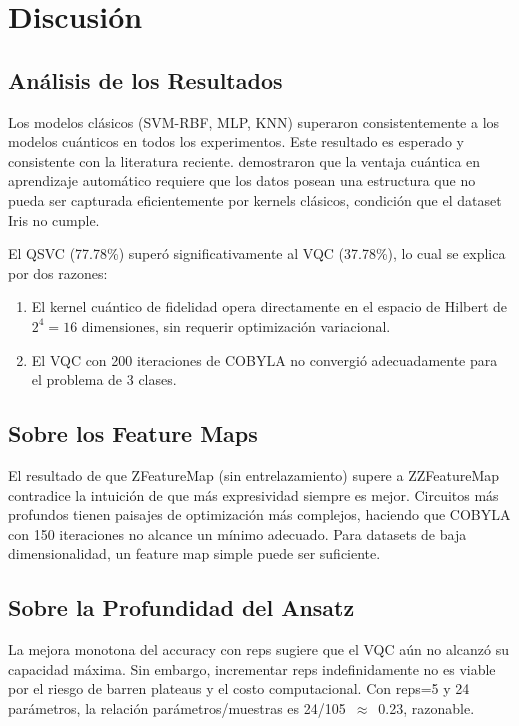 \section{Discusi\'on}

\subsection{An\'alisis de los Resultados}

Los modelos cl\'asicos (SVM-RBF, MLP, KNN) superaron consistentemente a los modelos cu\'anticos en todos los experimentos. Este resultado es esperado y consistente con la literatura reciente. \citet{huang2021} demostraron que la ventaja cu\'antica en aprendizaje autom\'atico requiere que los datos posean una estructura que no pueda ser capturada eficientemente por kernels cl\'asicos, condici\'on que el dataset Iris no cumple.

El QSVC (77.78\%) super\'o significativamente al VQC (37.78\%), lo cual se explica por dos razones:
\begin{enumerate}
    \item El kernel cu\'antico de fidelidad opera directamente en el espacio de Hilbert de $2^4 = 16$ dimensiones, sin requerir optimizaci\'on variacional.
    \item El VQC con 200 iteraciones de COBYLA no convergi\'o adecuadamente para el problema de 3 clases.
\end{enumerate}

\subsection{Sobre los Feature Maps}

El resultado de que ZFeatureMap (sin entrelazamiento) supere a ZZFeatureMap contradice la intuici\'on de que m\'as expresividad siempre es mejor. Circuitos m\'as profundos tienen paisajes de optimizaci\'on m\'as complejos, haciendo que COBYLA con 150 iteraciones no alcance un m\'inimo adecuado. Para datasets de baja dimensionalidad, un feature map simple puede ser suficiente.

\subsection{Sobre la Profundidad del Ansatz}

La mejora monotona del accuracy con reps sugiere que el VQC a\'un no alcanz\'o su capacidad m\'axima. Sin embargo, incrementar reps indefinidamente no es viable por el riesgo de barren plateaus \citep{cerezo2021} y el costo computacional. Con reps=5 y 24 par\'ametros, la relaci\'on par\'ametros/muestras es 24/105~$\approx$~0.23, razonable.

